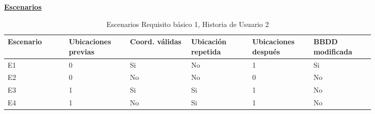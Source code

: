 \documentclass[../ei103948-project-documentation.tex]{subfiles}
\begin{document}
					\begin{center}
					\textbf{\underline{Escenarios}}
					\begin{table}[H]
						\centering
						\begin{tabular}{|p{0.14\linewidth}|p{0.14\linewidth}|p{0.14\linewidth}|p{0.14\linewidth}|p{0.14\linewidth}|p{0.14\linewidth}|}
						\hline
						\textbf{Escenario} & \textbf{Ubicaciones previas} & \textbf{Coord. válidas} & \textbf{Ubicación repetida} & \textbf{Ubicaciones después} & \textbf{BBDD modificada} \\ \hline
						E1                 & 0                        & Si                       & No                      & 1                        & Si                       \\ \hline
						E2                 & 0                        & No                       & No                      & 0                        & No                       \\ \hline
						E3                 & 1                        & Si                       & Si                      & 1                        & No                       \\ \hline
						E4                 & 1                        & No                       & Si                      & 1                        & No                       \\ \hline
						\end{tabular}
						\caption{Escenarios Requisito básico 1, Historia de Usuario 2}
					\end{table}

					\descripcionBasicaB



\end{center}
\end{document}
